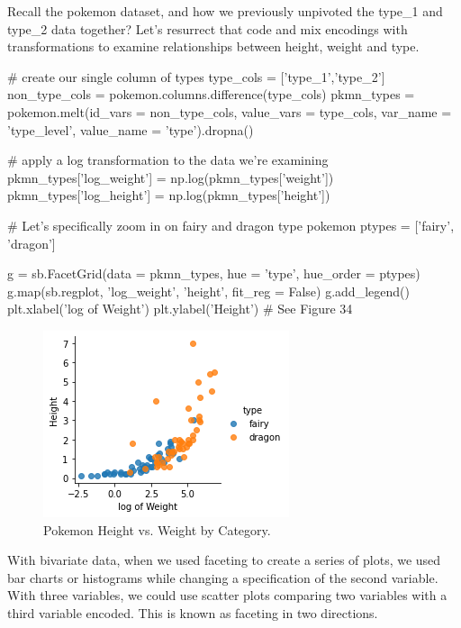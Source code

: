 Recall the pokemon dataset, and how we previously unpivoted the type\_1 and type\_2 data together? Let's resurrect that code and mix encodings with transformations to examine relationships between height, weight and type.

\begin{python}
	# create our single column of types
	type_cols = ['type_1','type_2']
	non_type_cols = pokemon.columns.difference(type_cols)
	pkmn_types = pokemon.melt(id_vars = non_type_cols, value_vars = type_cols, var_name = 'type_level', value_name = 'type').dropna()
	
	# apply a log transformation to the data we're examining
	pkmn_types['log_weight'] = np.log(pkmn_types['weight'])
	pkmn_types['log_height'] = np.log(pkmn_types['height'])
	
	# Let's specifically zoom in on fairy and dragon type pokemon
	ptypes = ['fairy', 'dragon']
	
	g = sb.FacetGrid(data = pkmn_types, hue = 'type', hue_order = ptypes)
	g.map(sb.regplot, 'log_weight', 'height', fit_reg = False)
	g.add_legend()
	plt.xlabel('log of Weight')
	plt.ylabel('Height')
	# See Figure 34
\end{python} 

\begin{figure}
	\includegraphics[width=\textwidth,height=\textheight,keepaspectratio]{images/figure34.png}
	\caption{Pokemon Height vs. Weight by Category.}\label{fig:figure34}
\end{figure}

With bivariate data, when we used faceting to create a series of plots, we used bar charts or histograms while changing a specification of the second variable. With three variables, we could use scatter plots comparing two variables with a third variable encoded. This is known as faceting in two directions.
\\\\

